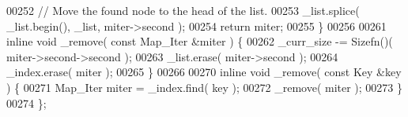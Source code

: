 \begin{DoxyCode}
00252                         \textcolor{comment}{// Move the found node to the head of the list.}
00253                         \_list.splice( \_list.begin(), \_list, miter->second );
00254                         \textcolor{keywordflow}{return} miter;
00255                 \}
00256 
00261                 \textcolor{keyword}{inline} \textcolor{keywordtype}{void} \_remove( \textcolor{keyword}{const} Map_Iter &miter ) \{
00262                         \_curr\_size -= Sizefn()( miter->second->second );
00263                         \_list.erase( miter->second );
00264                         \_index.erase( miter );
00265                 \}
00266 
00270                 \textcolor{keyword}{inline} \textcolor{keywordtype}{void} \_remove( \textcolor{keyword}{const} Key &key ) \{
00271                         Map_Iter miter = \_index.find( key );
00272                         \_remove( miter );
00273                 \}
00274 \};
\end{DoxyCode}
